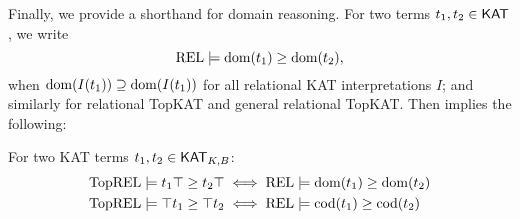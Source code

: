 Finally, we provide a shorthand for domain reasoning. 
For two terms \(t_{1}, t_{2}  \in  \mathsf{KAT}\), we write
\[\mathbf{\mathrm{REL}}  \models  \operatorname{\mathrm{dom}}(t_{1})  \geq  \operatorname{\mathrm{dom}}(t_{2}),\] when 
\(\operatorname{\mathrm{dom}}(I(t_{1}))  \supseteq  \operatorname{\mathrm{dom}}(I(t_{1}))\) for all relational KAT interpretations \(I\);  
and similarly for relational TopKAT and general relational TopKAT.  
Then  implies the following:
\begin{lemma}\label{the: top element represent domain}
    For two KAT terms \(t_{1}, t_{2}  \in  \mathsf{KAT}_{K, B}\):
    \begin{align*}
        \mathbf{\mathrm{TopREL}}  \models  t_{1}  \top   \geq  t_{2}  \top  &  \iff  \mathbf{\mathrm{REL}}  \models  \operatorname{\mathrm{dom}}(t_{1})  \geq  \operatorname{\mathrm{dom}}(t_{2}) \\
        \mathbf{\mathrm{TopREL}}  \models   \top  t_{1}  \geq   \top  t_{2} &  \iff  \mathbf{\mathrm{REL}}  \models  \operatorname{\mathrm{cod}}(t_{1})  \geq  \operatorname{\mathrm{cod}}(t_{2})
    \end{align*}
\end{lemma}

